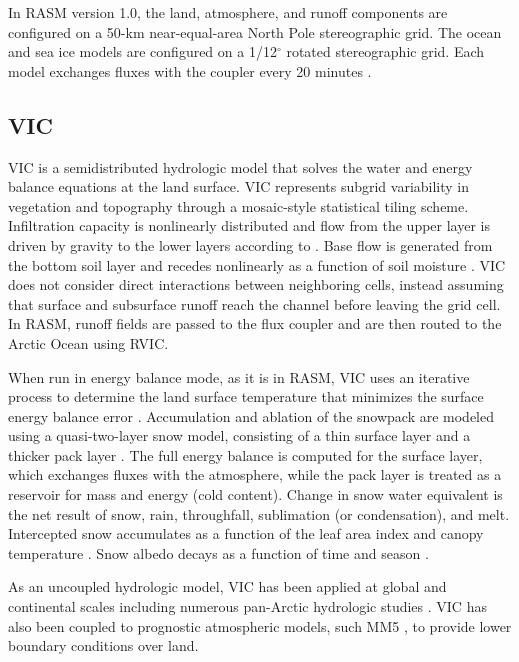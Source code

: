 In RASM version 1.0, the land, atmosphere, and runoff components are configured on a 50-km near-equal-area North Pole stereographic grid.
The ocean and sea ice models are configured on a 1/12$^{\circ}$ rotated stereographic grid.
Each model exchanges fluxes with the coupler every 20 minutes \citep{Roberts_2015a}.

\subsection{VIC}
\label{sec:vic}

VIC is a semidistributed hydrologic model that solves the water and energy balance equations at the land surface.
VIC represents subgrid variability in vegetation and topography through a mosaic-style statistical tiling scheme.
Infiltration capacity is nonlinearly distributed \citep{Zhao_1980} and flow from the upper layer is driven by gravity to the lower layers according to \citep{Campbell_1974}.
Base flow is generated from the bottom soil layer and recedes nonlinearly as a function of soil moisture \citep{Dumenil_1992,Todini_1996}.
VIC does not consider direct interactions between neighboring cells, instead assuming that surface and subsurface runoff reach the channel before leaving the grid cell.
In RASM, runoff fields are passed to the flux coupler and are then routed to the Arctic Ocean using RVIC.

When run in energy balance mode, as it is in RASM, VIC uses an iterative process to determine the land surface temperature that minimizes the surface energy balance error \citep{Liang_1999}.
Accumulation and ablation of the snowpack are modeled using a quasi-two-layer snow model, consisting of a thin surface layer and a thicker pack layer \citep{Andreadis_2009,Cherkauer_1999}.
The full energy balance is computed for the surface layer, which exchanges fluxes with the atmosphere, while the pack layer is treated as a reservoir for mass and energy (cold content).
Change in snow water equivalent is the net result of snow, rain, throughfall, sublimation (or condensation), and melt.
Intercepted snow accumulates as a function of the leaf area index and canopy temperature \citep{Storck_2002}.
Snow albedo decays as a function of time and season \citep{Andreadis_2009}.

As an uncoupled hydrologic model, VIC has been applied at global and continental scales \citep{Maurer_2001,Nijssen_1997,Nijssen_2001} including numerous pan-Arctic hydrologic studies \citep{Adam_2007,Slater_2007,Su_2005,Tan_2011}.
VIC has also been coupled to prognostic atmospheric models, such MM5 \citep{Zhu_2009}, to provide lower boundary conditions over land.

